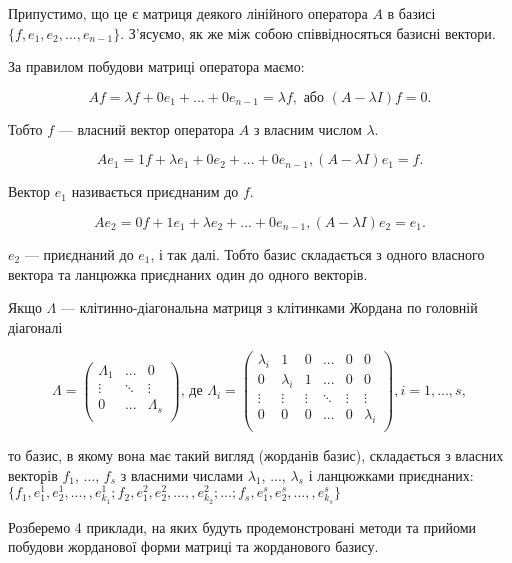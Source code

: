 Припустимо, що це є матриця деякого лінійного оператора $A$ в базисі
$\{f, e_1, e_2, ..., e_{n-1}\}$. З’ясуємо, як же між собою співвідносяться базисні вектори.

За правилом побудови матриці оператора маємо:

$$A f = \lambda f + 0 e_1 + ...  + 0 e_{n-1} = \lambda f, \text{ або } (A - \lambda I)f = 0.$$

Тобто $f$ --- власний вектор оператора $A$ з власним числом $\lambda$.

$$A e_1 = 1 f + \lambda e_1 + 0 e_2 + ...  + 0 e_{n-1}, (A - \lambda I)e_1 = f.$$

Вектор $e_1$ називається приєднаним до $f$.

$$A e_2 = 0 f + 1 e_1 + \lambda e_2 + ...  + 0 e_{n-1}, (A - \lambda I)e_2 = e_1.$$


$e_2$ --- приєднаний до $e_1$, і так далі. Тобто базис складається з одного власного
вектора та ланцюжка приєднаних один до одного векторів. 

Якщо $\Lambda$ --- клітинно-діагональна матриця з клітинками Жордана по
головній діагоналі

$$\Lambda = \begin{pmatrix}
	\Lambda_1 & ...    & 0         \\
	\vdots    & \ddots & \vdots    \\
	0         & ...    & \Lambda_s \\
\end{pmatrix} \text{, де } \Lambda_i = \begin{pmatrix}
	\lambda_i & 1         & 0      & ...    & 0      & 0         \\
	0         & \lambda_i & 1      & ...    & 0      & 0         \\
	\vdots    & \vdots    & \vdots & \ddots & \vdots & \vdots    \\
	0         & 0         & 0      & ...    & 0      & \lambda_i \\
\end{pmatrix}, i = 1, ..., s, $$

то базис, в якому вона має такий вигляд (жорданів базис), складається з
власних векторів $f_1$, ..., $f_s$ з власними числами $\lambda_1$, ..., $\lambda_s$ і ланцюжками
приєднаних:
$\{ f_1, e_1^1, e_2^1, ..., , e_{k_1}^1;
	f_2, e_1^2, e_2^2, ..., , e_{k_2}^2;
	...;
	f_s, e_1^s, e_2^s, ..., , e_{k_s}^s \}$

Розберемо 4 приклади, на яких будуть продемонстровані методи та
прийоми побудови жорданової форми матриці та жорданового базису.

